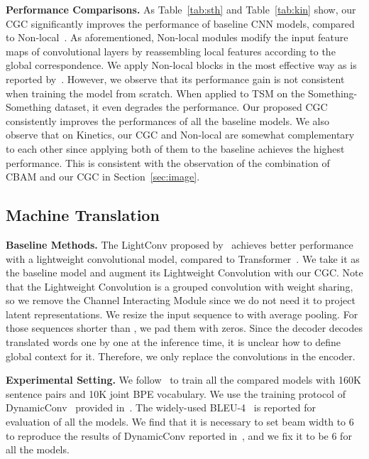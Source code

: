 \documentclass[runningheads]{llncs}
\begin{document}
\textbf{Performance Comparisons.} 
As Table~\ref{tab:sth} and Table~\ref{tab:kin} show, our CGC significantly improves the performance of baseline CNN models, compared to Non-local~\cite{wang2017non}. As aforementioned, Non-local modules modify the input feature maps of convolutional layers by reassembling local features according to the global correspondence. We apply Non-local blocks in the most effective way as is reported by~\cite{wang2017non}. However, we observe that its performance gain is not consistent when training the model from scratch. When applied to TSM on the Something-Something dataset, it even degrades the performance. Our proposed CGC consistently improves the performances of all the baseline models. We also observe that on Kinetics, our CGC and Non-local are somewhat complementary to each other since applying both of them to the baseline achieves the highest performance. This is consistent with the observation of the combination of CBAM and our CGC in Section~\ref{sec:image}.


\subsection{Machine Translation}
\label{exp:lab}
\textbf{Baseline Methods.} The LightConv proposed by~\cite{wu2019pay} achieves better performance with a lightweight convolutional model, compared to Transformer~\cite{vaswani2017attention}. We take it as the baseline model and augment its Lightweight Convolution with our CGC. Note that the Lightweight Convolution is a grouped convolution  with weight sharing, so we remove the Channel Interacting Module since we do not need it to project latent representations. We resize the input sequence  to  with average pooling. For those sequences shorter than , we pad them with zeros. Since the decoder decodes translated words one by one at the inference time, it is unclear how to define global context for it. Therefore, we only replace the convolutions in the encoder.

\textbf{Experimental Setting.} 
We follow~\cite{wu2019pay} to train all the compared models with 160K sentence pairs and 10K joint BPE vocabulary. We use the training protocol of DynamicConv~\cite{wu2019pay} provided in~\cite{ott2019fairseq}. The widely-used BLEU-4~\cite{papineni2002bleu} is reported for evaluation of all the models. We find that it is necessary to set beam width to 6 to reproduce the results of DynamicConv reported in~\cite{wu2019pay}, and we fix it to be 6 for all the models.
\end{document}
